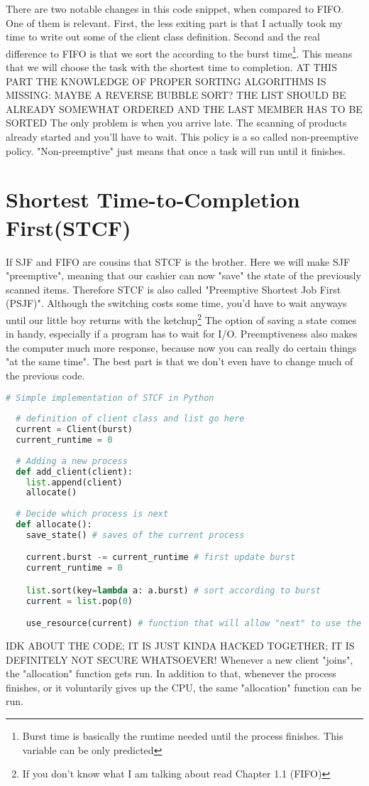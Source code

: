 \documentclass{report}
\newcounter{defi}[section]\setcounter{defi}{0}
\begin{document}
There are two notable changes in this code snippet, when compared to FIFO. One of them is relevant.
First, the less exiting part is that I actually took my time to write out some of the client class definition.
Second and the real difference to FIFO is that we sort the according to the burst time\footnote{Burst time is basically the runtime needed until the process finishes. This variable can be only predicted}. 
This means that we will choose the task with the shortest time to completion.
AT THIS PART THE KNOWLEDGE OF PROPER SORTING ALGORITHMS IS MISSING: MAYBE A REVERSE BUBBLE SORT? 
THE LIST SHOULD BE ALREADY SOMEWHAT ORDERED AND THE LAST MEMBER HAS TO BE SORTED
The only problem is when you arrive late. The scanning of products already started and you'll have to wait.
This policy is a so called non-preemptive policy.
"Non-preemptive" just means that once a task will run until it finishes.


\section{Shortest Time-to-Completion First(STCF)}

If SJF and FIFO are cousins that STCF is the brother.
Here we will make SJF "preemptive", meaning that our cashier can now "save" the state of the previously scanned items. 
Therefore STCF is also called "Preemptive Shortest Job First (PSJF)".
Although the switching costs some time, you'd have to wait anyways until our little boy returns with the ketchup\footnote{If you don't know what I am talking about read Chapter 1.1 (FIFO)}
The option of saving a state comes in handy, especially if a program has to wait for I/O.
Preemptiveness also makes the computer much more response, because now you can really do certain things "at the same time".
The best part is that we don't even have to change much of the previous code.
\pagebreak
\begin{lstlisting}[language=Python, style=colorEX]
  # Simple implementation of STCF in Python
  
  # definition of client class and list go here
  current = Client(burst)
  current_runtime = 0
  
  # Adding a new process
  def add_client(client): 
    list.append(client)
    allocate()
  
  # Decide which process is next
  def allocate():
    save_state() # saves of the current process

    current.burst -= current_runtime # first update burst
    current_runtime = 0

    list.sort(key=lambda a: a.burst) # sort according to burst
    current = list.pop(0)

    use_resource(current) # function that will allow "next" to use the CPU (also tracks runtime)
\end{lstlisting}
IDK ABOUT THE CODE; IT IS JUST KINDA HACKED TOGETHER; IT IS DEFINITELY NOT SECURE WHATSOEVER! 
Whenever a new client "joins", the "allocation" function gets run.
In addition to that, whenever the process finishes, or it voluntarily gives up the CPU, the same "allocation" function can be run.
\end{document}
